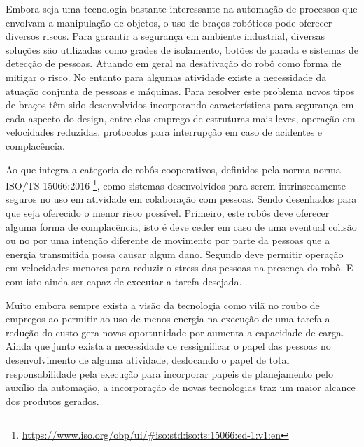 Embora seja uma tecnologia bastante interessante na automação de processos que envolvam a manipulação de objetos, o uso de braços robóticos pode oferecer diversos riscos. Para garantir a segurança em ambiente industrial, diversas soluções são utilizadas como grades de isolamento, botões de parada e sistemas de detecção de pessoas. Atuando em geral na desativação do robô como forma de mitigar o risco. No entanto para algumas atividade existe a necessidade da atuação conjunta de pessoas e máquinas. Para resolver este problema novos tipos de braços têm sido desenvolvidos incorporando características para segurança em cada aspecto do design, entre elas emprego de estruturas mais leves, operação em velocidades reduzidas, protocolos para interrupção em caso de acidentes e complacência.%

Ao que integra a categoria de robôs cooperativos, definidos pela norma  norma ISO/TS 15066:2016 \footnote{\url{https://www.iso.org/obp/ui/#iso:std:iso:ts:15066:ed-1:v1:en}}, como sistemas desenvolvidos para serem intrinsecamente seguros no uso em atividade em colaboração com pessoas. Sendo desenhados para que seja oferecido o menor risco possível. Primeiro, este robôs deve oferecer alguma forma de complacência, isto é deve ceder em caso de uma eventual colisão ou no por uma intenção diferente de movimento por parte da pessoas que a energia transmitida possa causar algum dano. Segundo deve permitir operação em velocidades menores para reduzir o stress das pessoas na presença do robô. E com isto ainda ser capaz de executar a tarefa desejada.

Muito embora sempre exista a visão da tecnologia como vilã no roubo de empregos ao permitir ao uso de menos energia na execução de uma tarefa a redução do custo gera novas oportunidade por aumenta a capacidade de carga. Ainda que junto exista a necessidade de ressignificar o papel das pessoas no desenvolvimento de alguma atividade, deslocando o papel de total responsabilidade pela execução para incorporar papeis de planejamento pelo auxílio da automação, a incorporação de novas tecnologias traz um maior alcance dos produtos gerados.




